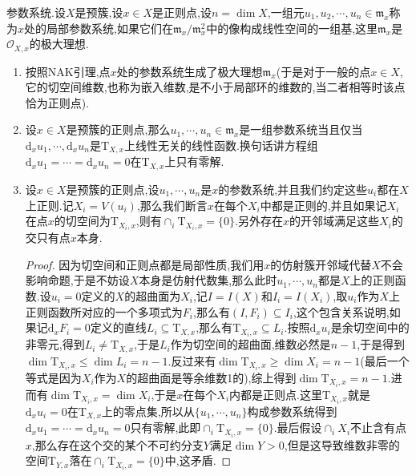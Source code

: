 参数系统.设$X$是预簇,设$x\in X$是正则点,设$n=\dim X$,一组元$u_1,u_2,\cdots,u_n\in\mathfrak{m}_x$称为$x$处的局部参数系统,如果它们在$\mathfrak{m}_x/\mathfrak{m}_x^2$中的像构成线性空间的一组基,这里$\mathfrak{m}_x$是$\mathscr{O}_{X,x}$的极大理想.
\begin{enumerate}
    \item 按照NAK引理,点$x$处的参数系统生成了极大理想$\mathfrak{m}_x$(于是对于一般的点$x\in X$,它的切空间维数,也称为嵌入维数,是不小于局部环的维数的,当二者相等时该点恰为正则点).
	\item 设$x\in X$是预簇的正则点,那么$u_1,\cdots,u_n\in\mathfrak{m}_x$是一组参数系统当且仅当$\mathrm{d}_xu_1,\cdots,\mathrm{d}_xu_n$是$\mathrm{T}_{X,x}$上线性无关的线性函数.换句话讲方程组$\mathrm{d}_xu_1=\cdots=\mathrm{d}_xu_n=0$在$\mathrm{T}_{X,x}$上只有零解.
	\item 设$x\in X$是预簇的正则点,设$u_1,\cdots,u_n$是$x$的参数系统,并且我们约定这些$u_i$都在$X$上正则.记$X_i=V(u_i)$,那么我们断言$x$在每个$X_i$中都是正则的,并且如果记$X_i$在点$x$的切空间为$\mathrm{T}_{X_i,x}$,则有$\cap_i\mathrm{T}_{X_i,x}=\{0\}$.另外存在$x$的开邻域满足这些$X_i$的交只有点$x$本身.
	\begin{proof}
		
		因为切空间和正则点都是局部性质,我们用$x$的仿射簇开邻域代替$X$不会影响命题,于是不妨设$X$本身是仿射代数集,那么此时$u_1,\cdots,u_n$都是$X$上的正则函数.设$u_i=0$定义的$X$的超曲面为$X_i$,记$I=I(X)$和$I_i=I(X_i)$,取$u_i$作为$X$上正则函数所对应的一个多项式为$F_i$,那么有$(I,F_i)\subseteq I_i$,这个包含关系说明,如果记$\mathrm{d}_xF_i=0$定义的直线$L_i\subseteq\mathrm{T}_{X,x}$,那么有$\mathrm{T}_{X_i,x}\subseteq L_i$.按照$\mathrm{d}_xu_i$是余切空间中的非零元,得到$L_i\not=\mathrm{T}_{X,x}$,于是$L_i$作为切空间的超曲面,维数必然是$n-1$,于是得到$\dim\mathrm{T}_{X_i,x}\le\dim L_i=n-1$.反过来有$\dim\mathrm{T}_{X_i,x}\ge\dim X_i=n-1$(最后一个等式是因为$X_i$作为$X$的超曲面是等余维数1的),综上得到$\dim\mathrm{T}_{X_i,x}=n-1$.进而有$\dim\mathrm{T}_{X_i,x}=\dim X_i$,于是$x$在每个$X_i$内都是正则点.这里$\mathrm{T}_{X_i,x}$就是$\mathrm{d}_xu_i=0$在$\mathrm{T}_{X,x}$上的零点集,所以从$\{u_1,\cdots,u_n\}$构成参数系统得到$\mathrm{d}_xu_1=\cdots=\mathrm{d}_xu_n=0$只有零解,此即$\cap_i\mathrm{T}_{X_i,x}=\{0\}$.最后假设$\cap_iX_i$不止含有点$x$,那么存在这个交的某个不可约分支$Y$满足$\dim Y>0$,但是这导致维数非零的空间$\mathrm{T}_{Y,x}$落在$\cap_i\mathrm{T}_{X_i,x}=\{0\}$中,这矛盾.
	\end{proof}
\end{enumerate}

